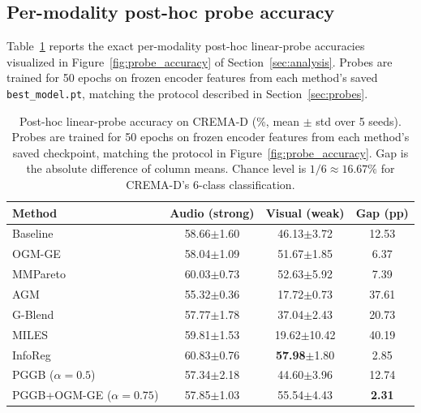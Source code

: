 \documentclass{article}
\begin{document}
\subsection{Per-modality post-hoc probe accuracy}
\label{app:posthoc_probe_table}

Table~\ref{tab:probe_accuracy} reports the exact per-modality post-hoc linear-probe accuracies visualized in Figure~\ref{fig:probe_accuracy} of Section~\ref{sec:analysis}. Probes are trained for 50 epochs on frozen encoder features from each method's saved \texttt{best\_model.pt}, matching the protocol described in Section~\ref{sec:probes}.

\begin{table}[H]
\centering
\caption{Post-hoc linear-probe accuracy on CREMA-D (\%, mean $\pm$ std over 5 seeds). Probes are trained for 50 epochs on frozen encoder features from each method's saved checkpoint, matching the protocol in Figure~\ref{fig:probe_accuracy}. Gap is the absolute difference of column means. Chance level is $1/6 \approx 16.67\%$ for CREMA-D's 6-class classification.}
\label{tab:probe_accuracy}
\vspace{0.3em}
\begin{tabular}{lccc}
\toprule
\textbf{Method} & \textbf{Audio (strong)} & \textbf{Visual (weak)} & \textbf{Gap (pp)} \\
\midrule
Baseline                        & 58.66{\scriptsize$\pm$1.60}  & 46.13{\scriptsize$\pm$3.72}  & 12.53 \\
OGM-GE                          & 58.04{\scriptsize$\pm$1.09}  & 51.67{\scriptsize$\pm$1.85}  & 6.37 \\
MMPareto                        & 60.03{\scriptsize$\pm$0.73}  & 52.63{\scriptsize$\pm$5.92}  & 7.39 \\
AGM                             & 55.32{\scriptsize$\pm$0.36}  & 17.72{\scriptsize$\pm$0.73}  & 37.61 \\
G-Blend                         & 57.77{\scriptsize$\pm$1.78}  & 37.04{\scriptsize$\pm$2.43}  & 20.73 \\
MILES                           & 59.81{\scriptsize$\pm$1.53}  & 19.62{\scriptsize$\pm$10.42} & 40.19 \\
InfoReg                         & 60.83{\scriptsize$\pm$0.76}  & \textbf{57.98}{\scriptsize$\pm$1.80}  & 2.85 \\
PGGB ($\alpha{=}0.5$)           & 57.34{\scriptsize$\pm$2.18}  & 44.60{\scriptsize$\pm$3.96}  & 12.74 \\
PGGB+OGM-GE ($\alpha{=}0.75$)   & 57.85{\scriptsize$\pm$1.03}  & 55.54{\scriptsize$\pm$4.43}  & \textbf{2.31} \\
\bottomrule
\end{tabular}
\end{table}
\end{document}
